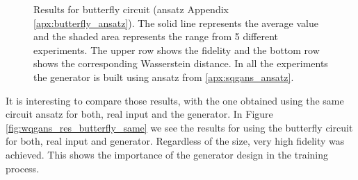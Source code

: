 \begin{figure}[htbp!]
  \caption{Results for butterfly circuit (ansatz Appendix \ref{apx:butterfly_ansatz}).
    The solid line represents the average value and the shaded area
    represents the range from 5 different experiments. The upper row shows the
    fidelity and the bottom row shows the corresponding Wasserstein distance. In all the
    experiments the generator is built using ansatz from \ref{apx:sqgans_ansatz}.}
  \label{fig:wqgans_res_butterfly_1}
\end{figure}

It is interesting to compare those results, with the one obtained using the
same circuit ansatz for both, real input and the generator. In Figure
\ref{fig:wqgans_res_butterfly_same} we see the results for using the butterfly
circuit for both, real input and generator. Regardless of the size, very high
fidelity was achieved. This shows the importance of the generator design in the
training process.


